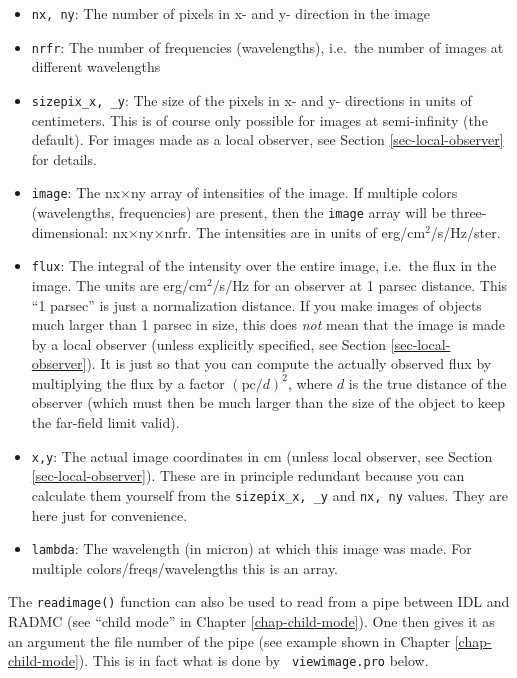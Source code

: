 \documentclass{report}
\begin{document}
\begin{itemize}
\item[] {\small\tt nx, ny}: The number of pixels in x- and y- direction in the image
\item[] {\small\tt nrfr}: The number of frequencies (wavelengths), i.e.\ the number of images at different wavelengths
\item[] {\small\tt sizepix\_x, \_y}: The size of the pixels in x- and y-
  directions in units of centimeters. This is of course only possible for
  images at semi-infinity (the default). For images made as a local
  observer, see Section \ref{sec-local-observer} for details.
\item[] {\small\tt image}: The nx$\times$ny array of intensities of the image.
  If multiple colors (wavelengths, frequencies) are present, then the
  {\small\tt image} array will be three-dimensional:  nx$\times$ny$\times$nrfr.
  The intensities are in units of erg/cm$^2$/s/Hz/ster.
\item[] {\small\tt flux}: The integral of the intensity over the entire image,
  i.e.\ the flux in the image. The units are erg/cm$^2$/s/Hz for an 
  observer at 1 parsec distance. This ``1 parsec'' is just a normalization
  distance. If you make images of objects much larger than 1 parsec in size,
  this does {\em not} mean that the image is made by a local observer (unless
  explicitly specified, see Section \ref{sec-local-observer}). It is just
  so that you can compute the actually observed flux by multiplying the flux
  by a factor $(\mathrm{pc}/d)^2$, where $d$ is the true distance of the 
  observer (which must then be much larger than the size of the object to
  keep the far-field limit valid).
\item[] {\small\tt x,y}: The actual image coordinates in cm (unless local
  observer, see Section \ref{sec-local-observer}). These are in principle
  redundant because you can calculate them yourself from the 
  {\small\tt sizepix\_x, \_y} and {\small\tt nx, ny} values. They are here just for
  convenience.
\item[] {\small\tt lambda}: The wavelength (in micron) at which this image was
  made. For multiple colors/freqs/wavelengths this is an array.
\end{itemize}
The {\small\tt readimage()} function can also be used to read from a pipe between
IDL and RADMC (see ``child mode'' in Chapter \ref{chap-child-mode}). One
then gives it as an argument the file number of the pipe (see example shown
in Chapter \ref{chap-child-mode}). This is in fact what is done by {\small\tt
  viewimage.pro} below.
\end{document}
